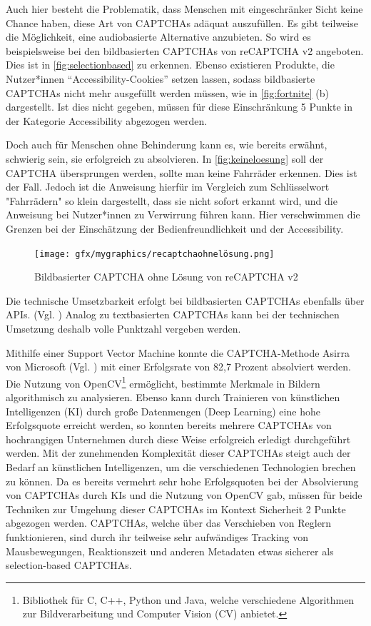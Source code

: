 Auch hier besteht die Problematik, dass Menschen mit eingeschränker Sicht keine Chance haben, diese Art von CAPTCHAs adäquat auszufüllen.
Es gibt teilweise die Möglichkeit, eine audiobasierte Alternative anzubieten. 
So wird es beispielsweise bei den bildbasierten CAPTCHAs von reCAPTCHA v2 angeboten. 
Dies ist in \autoref{fig:selectionbased} zu erkennen.
Ebenso existieren Produkte, die Nutzer*innen ``Accessibility-Cookies'' setzen lassen, 
sodass bildbasierte CAPTCHAs nicht mehr ausgefüllt werden müssen, wie in \autoref{fig:fortnite} (b) dargestellt.
Ist dies nicht gegeben, müssen für diese Einschränkung 5 Punkte in der Kategorie Accessibility abgezogen werden.

Doch auch für Menschen ohne Behinderung kann es, wie bereits erwähnt, schwierig sein, sie erfolgreich zu absolvieren.
In \autoref{fig:keineloesung} soll der CAPTCHA übersprungen werden, sollte man keine Fahrräder erkennen.
Dies ist der Fall. 
Jedoch ist die Anweisung hierfür im Vergleich zum Schlüsselwort "Fahrrädern" so klein dargestellt, dass sie nicht sofort erkannt wird,
und die Anweisung bei Nutzer*innen zu Verwirrung führen kann.
Hier verschwimmen die Grenzen bei der Einschätzung der Bedienfreundlichkeit und der Accessibility.

\begin{figure}[h!]
    \centering
    \texttt{[image: gfx/mygraphics/recaptchaohnelösung.png]}
    \caption{Bildbasierter CAPTCHA ohne Lösung von reCAPTCHA v2}   
    \label{fig:keineloesung}
\end{figure}

Die technische Umsetzbarkeit erfolgt bei bildbasierten CAPTCHAs ebenfalls über APIs. (Vgl. \cite{hcaptcha} \cite{arkoselabs} \cite{geetest})
Analog zu textbasierten CAPTCHAs kann bei der technischen Umsetzung deshalb volle Punktzahl vergeben werden.

Mithilfe einer Support Vector Machine konnte die CAPTCHA-Methode Asirra von Microsoft (Vgl. \cite{elson2007asirra})
mit einer Erfolgsrate von 82,7 Prozent absolviert werden. 
Die Nutzung von OpenCV\footnote[4]{Bibliothek für C, C++, Python und Java, welche verschiedene Algorithmen zur Bildverarbeitung und Computer Vision (CV) anbietet.}
ermöglicht, bestimmte Merkmale in Bildern algorithmisch zu analysieren.
Ebenso kann durch Trainieren von künstlichen Intelligenzen (KI) durch große Datenmengen (Deep Learning) eine hohe Erfolgsquote erreicht werden,
so konnten bereits mehrere CAPTCHAs von hochrangigen Unternehmen durch diese Weise erfolgreich erledigt durchgeführt werden.
Mit der zunehmenden Komplexität dieser CAPTCHAs steigt auch der Bedarf an künstlichen Intelligenzen, um die verschiedenen Technologien brechen zu können.
Da es bereits vermehrt sehr hohe Erfolgsquoten bei der Absolvierung von CAPTCHAs durch KIs und die Nutzung von OpenCV gab,
müssen für beide Techniken zur Umgehung dieser CAPTCHAs im Kontext Sicherheit 2 Punkte abgezogen werden.
CAPTCHAs, welche über das Verschieben von Reglern funktionieren, sind durch ihr teilweise sehr aufwändiges Tracking von Mausbewegungen,
Reaktionszeit und anderen Metadaten etwas sicherer als selection-based CAPTCHAs. \cite[p.77f]{surveyofresearch}

